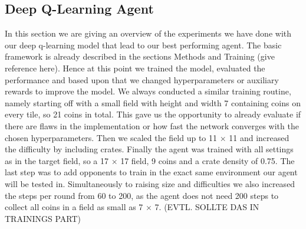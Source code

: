 \subsection{Deep Q-Learning Agent}

In this section we are giving an overview of the experiments we have done with our deep q-learning model that lead to our best performing agent. The basic framework is already described in the sections Methods and Training (give reference here). Hence at this point we trained the model, evaluated the performance and based upon that we changed hyperparameters or auxiliary rewards to improve the model. We always conducted a similar training routine, namely starting off with a small field with height and width 7 containing coins on every tile, so 21 coins in total. This gave us the opportunity to already evaluate if there are flaws in the implementation or how fast the network converges with the chosen hyperparameters. Then we scaled the field up to 11 $\times$ 11 and increased the difficulty by including crates. Finally the agent was trained with all settings as in the target field, so a 17 $\times$ 17 field, 9 coins and a crate density of 0.75. The last step was to add opponents to train in the exact same environment our agent will be tested in. Simultaneously to raising size and difficulties we also increased the steps per round from 60 to 200, as the agent does not need 200 steps to collect all coins in a field as small as 7 $\times$ 7. (EVTL. SOLLTE DAS IN TRAININGS PART)

